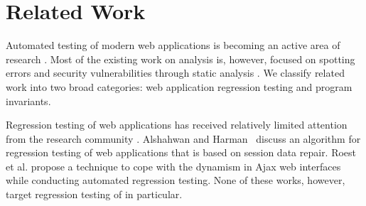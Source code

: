 \section{Related Work}
\label{Sec:relatedWork}

Automated testing of modern web applications is becoming an active area of research \cite{artzi:icse11,tonella:icst08,mesbah:tse12,dodom:2010}.
Most of the existing work on \javascript analysis is, however, focused on spotting errors and security vulnerabilities through static analysis \cite{Guarnieri-2009,Guha-2009,Zheng-2011}.
We classify related work into two broad categories: web application regression testing and program invariants.



Regression testing of web applications has received relatively limited attention from the research community \cite{lei:reg03,tarhini:reg08}.
Alshahwan and Harman~\cite{harman:icst08} discuss an algorithm for regression testing of web applications that is based on session data \cite{sprenkle:replayweb,elbaum:webtest} repair. Roest et al. \cite{Roest:2010.icst} propose a technique to cope with the dynamism in Ajax web interfaces while conducting automated regression testing. None of these works, however, target regression testing of \javascript in particular.

